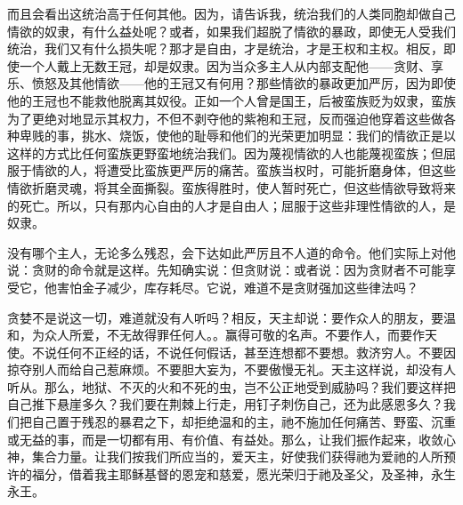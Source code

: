 而且会看出这统治高于任何其他。因为，请告诉我，统治我们的人类同胞却做自己情欲的奴隶，有什么益处呢？或者，如果我们超脱了情欲的暴政，即使无人受我们统治，我们又有什么损失呢？那才是自由，才是统治，才是王权和主权。相反，即使一个人戴上无数王冠，却是奴隶。因为当众多主人从内部支配他——贪财、享乐、愤怒及其他情欲——他的王冠又有何用？那些情欲的暴政更加严厉，因为即使他的王冠也不能救他脱离其奴役。正如一个人曾是国王，后被蛮族贬为奴隶，蛮族为了更绝对地显示其权力，不但不剥夺他的紫袍和王冠，反而强迫他穿着这些做各种卑贱的事，挑水、烧饭，使他的耻辱和他们的光荣更加明显：我们的情欲正是以这样的方式比任何蛮族更野蛮地统治我们。因为蔑视情欲的人也能蔑视蛮族；但屈服于情欲的人，将遭受比蛮族更严厉的痛苦。蛮族当权时，可能折磨身体，但这些情欲折磨灵魂，将其全面撕裂。蛮族得胜时，使人暂时死亡，但这些情欲导致将来的死亡。所以，只有那内心自由的人才是自由人；屈服于这些非理性情欲的人，是奴隶。\par

没有哪个主人，无论多么残忍，会下达如此严厉且不人道的命令。他们实际上对他说：贪财的命令就是这样。先知确实说：但贪财说：或者说：因为贪财者不可能享受它，他害怕金子减少，库存耗尽。它说，难道不是贪财强加这些律法吗？\par

贪婪不是说这一切，难道就没有人听吗？相反，天主却说：要作众人的朋友，要温和，为众人所爱，不无故得罪任何人。。赢得可敬的名声。不要作人，而要作天使。不说任何不正经的话，不说任何假话，甚至连想都不要想。救济穷人。不要因掠夺别人而给自己惹麻烦。不要胆大妄为，不要傲慢无礼。天主这样说，却没有人听从。那么，地狱、不灭的火和不死的虫，岂不公正地受到威胁吗？我们要这样把自己推下悬崖多久？我们要在荆棘上行走，用钉子刺伤自己，还为此感恩多久？我们把自己置于残忍的暴君之下，却拒绝温和的主，祂不施加任何痛苦、野蛮、沉重或无益的事，而是一切都有用、有价值、有益处。那么，让我们振作起来，收敛心神，集合力量。让我们按我们所应当的，爱天主，好使我们获得祂为爱祂的人所预许的福分，借着我主耶稣基督的恩宠和慈爱，愿光荣归于祂及圣父，及圣神，永生永王。\par

